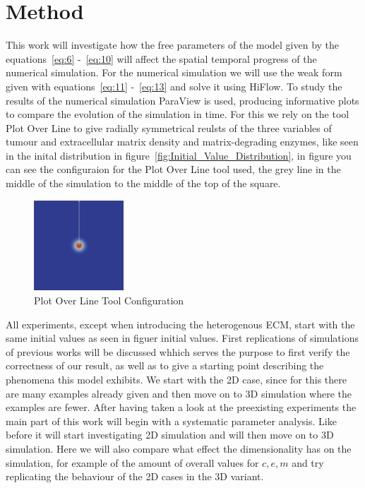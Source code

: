

\section{Method}


This work will investigate how the free parameters of the model given by the equations~\ref{eq:6} -~\ref{eq:10} will affect the spatial temporal progress of the numerical simulation. For the numerical simulation we will use the weak form given with equations~\ref{eq:11} -~\ref{eq:13} and solve it using HiFlow. To study the results of the numerical simulation ParaView is used, producing informative plots to compare the evolution of the simulation in time. For this we rely on the tool Plot Over Line to give radially symmetrical reulsts of the three variables of tumour and extracellular matrix density and matrix-degrading enzymes, like seen in the inital distribution in figure~\ref{fig:Initial_Value_Distribution}, in figure you can see the configuraion for the Plot Over Line tool used, the grey line in the middle of the simulation to the middle of the top of the square.\newline
\begin{figure}
    \centering
    \includegraphics[width=0.3\textwidth]{resources/images/plot_over_line_tool.png}
    \caption{Plot Over Line Tool Configuration}
    \label{fig:PlotOverLine}
\end{figure}
All experiments, except when introducing the heterogenous ECM, start with the same initial values as seen in figuer initial values.\newline 
First replications of simulations of previous works will be discussed whhich serves the purpose to first verify the correctness of our result, as well as to give a starting point describing the phenomena this model exhibits. We start with the 2D case, since for this there are many examples already given and then move on to 3D simulation where the examples are fewer. \newline
After having taken a look at the preexisting experiments the main part of this work will begin with a systematic parameter analysis. Like before it will start investigating 2D simulation and will then move on to 3D simulation. Here we will also compare what effect the dimensionality has on the simulation, for example of the amount of overall values for $c,e,m$ and try replicating the behaviour of the 2D cases in the 3D variant. \newline
